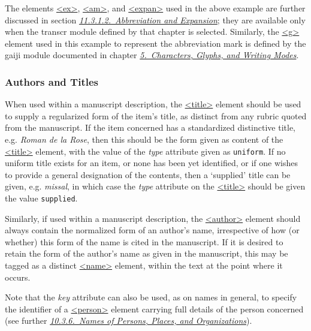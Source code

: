 The elements \hyperref[TEI.ex]{<ex>}, \hyperref[TEI.am]{<am>}, and \hyperref[TEI.expan]{<expan>} used in the above example are further discussed in section \textit{\hyperref[PHAB]{11.3.1.2.\ Abbreviation and Expansion}}; they are available only when the \textsf{transcr} module defined by that chapter is selected. Similarly, the \hyperref[TEI.g]{<g>} element used in this example to represent the abbreviation mark is defined by the \textsf{gaiji} module documented in chapter \textit{\hyperref[WD]{5.\ Characters, Glyphs, and Writing Modes}}.
\subsubsection[{Authors and Titles}]{Authors and Titles}\label{msat}\par
When used within a manuscript description, the \hyperref[TEI.title]{<title>} element should be used to supply a regularized form of the item's title, as distinct from any rubric quoted from the manuscript. If the item concerned has a standardized distinctive title, e.g. \textit{Roman de la Rose}, then this should be the form given as content of the \hyperref[TEI.title]{<title>} element, with the value of the {\itshape type} attribute given as \texttt{uniform}. If no uniform title exists for an item, or none has been yet identified, or if one wishes to provide a general designation of the contents, then a ‘supplied’ title can be given, e.g. \textit{missal}, in which case the {\itshape type} attribute on the \hyperref[TEI.title]{<title>} should be given the value \texttt{supplied}.\par
Similarly, if used within a manuscript description, the \hyperref[TEI.author]{<author>} element should always contain the normalized form of an author's name, irrespective of how (or whether) this form of the name is cited in the manuscript. If it is desired to retain the form of the author's name as given in the manuscript, this may be tagged as a distinct \hyperref[TEI.name]{<name>} element, within the text at the point where it occurs.\par
Note that the {\itshape key} attribute can also be used, as on names in general, to specify the identifier of a \hyperref[TEI.person]{<person>} element carrying full details of the person concerned (see further \textit{\hyperref[msnames]{10.3.6.\ Names of Persons, Places, and Organizations}}).\par
